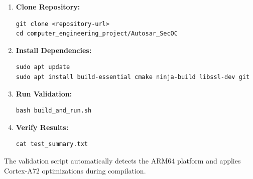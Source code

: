 \begin{enumerate}
	\item \textbf{Clone Repository:}
	\begin{verbatim}
git clone <repository-url>
cd computer_engineering_project/Autosar_SecOC
	\end{verbatim}

	\item \textbf{Install Dependencies:}
	\begin{verbatim}
sudo apt update
sudo apt install build-essential cmake ninja-build libssl-dev git
	\end{verbatim}

	\item \textbf{Run Validation:}
	\begin{verbatim}
bash build_and_run.sh
	\end{verbatim}

	\item \textbf{Verify Results:}
	\begin{verbatim}
cat test_summary.txt
	\end{verbatim}
\end{enumerate}

The validation script automatically detects the ARM64 platform and applies
Cortex-A72 optimizations during compilation.


